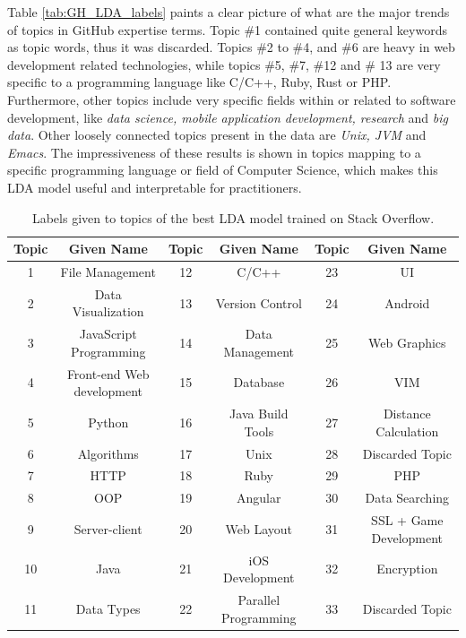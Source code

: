             Table \ref{tab:GH_LDA_labels} paints a clear picture of what are the major trends of topics in GitHub expertise terms. Topic \#1 contained quite general keywords as topic words, thus it was discarded. Topics \#2 to \#4, and \#6 are heavy in web development related technologies, while topics \#5, \#7, \#12 and \# 13 are very specific to a programming language like C/C++, Ruby, Rust or PHP. Furthermore, other topics include very specific fields within or related to software development, like \emph{data science, mobile application development, research} and \emph{big data}. Other loosely connected topics present in the data are \emph{Unix, JVM} and \emph{Emacs}. The impressiveness of these results is shown in topics mapping to a specific programming language or field of Computer Science, which makes this LDA model useful and interpretable for practitioners.  
            
            \begin{table}
              \centering
              \caption{Labels given to topics of the best LDA model trained on Stack Overflow.}\label{tab:SO_LDA_labels}
                \vspace{6pt} %
               \resizebox{\textwidth}{!} {
              \begin{tabular}{|c c|c c|c c|}
                \hline
                Topic & Given Name & Topic & Given Name & Topic & Given Name \\
                \hline
                1 & File Management & 12 & C/C++ & 23 & UI \\
                2 & Data Visualization & 13 & Version Control & 24 & Android \\
                3 & JavaScript Programming & 14 & Data Management & 25 & Web Graphics \\
                4 & Front-end Web development & 15 & Database & 26 & VIM \\
                5 & Python & 16 & Java Build Tools & 27 & Distance Calculation \\
                6 & Algorithms & 17 & Unix & 28 & Discarded Topic \\
                7 & HTTP & 18 & Ruby & 29 & PHP \\
                8 & OOP & 19 & Angular & 30 & Data Searching \\
                9 & Server-client & 20 & Web Layout & 31 & SSL + Game Development \\
                10 & Java & 21 & iOS Development & 32 & Encryption \\
                11 & Data Types & 22 & Parallel Programming & 33 & Discarded Topic \\
                \hline
              \end{tabular}}
            \end{table}
            
